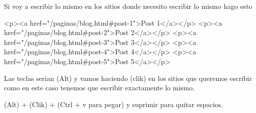 Si voy a escribir lo mismo en los sitios donde necesito escribir lo mismo hago esto 


<p><a href="/paginas/blog.html#post-1">Post 1</a></p>
<p><a href="/paginas/blog.html#post-2">Post 2</a></p>
<p><a href="/paginas/blog.html#post-3">Post 3</a></p>
<p><a href="/paginas/blog.html#post-4">Post 4</a></p>
<p><a href="/paginas/blog.html#post-5">Post 5</a></p>


Las teclas serian (Alt) y vamos haciendo (clik) en los sitios que queremos escribir como en este caso tenemos que escribir exactamente lo mismo.

(Alt) + (Clik) + (Ctrl + v para pegar) y suprimir para quitar espacios.